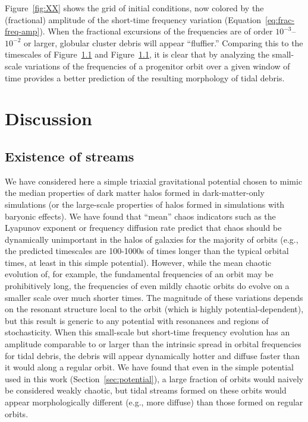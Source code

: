 \documentclass[letterpaper,12pt,preprint]{aastex}
\begin{document}
Figure~\ref{fig:XX} shows the grid of initial conditions, now colored by the (fractional) amplitude of the short-time frequency variation (Equation~\ref{eq:frac-freq-amp}). When the fractional excursions of the frequencies are of order $10^{-3}$--$10^{-2}$ or larger, globular cluster debris will appear ``fluffier.'' Comparing this to the timescales of Figure~\ref{} and Figure~\ref{}, it is clear that by analyzing the small-scale variations of the frequencies of a progenitor orbit over a given window of time provides a better prediction of the resulting morphology of tidal debris. 

\section{Discussion}\label{sec:discussion}

\subsection{Existence of streams}

We have considered here a simple triaxial gravitational potential chosen to mimic the median properties of dark matter halos formed in dark-matter-only simulations (or the large-scale properties of halos formed in simulations with baryonic effects). We have found that ``mean'' chaos indicators such as the Lyapunov exponent or frequency diffusion rate predict that chaos should be dynamically unimportant in the halos of galaxies for the majority of orbits (e.g., the predicted timescales are 100-1000s of times longer than the typical orbital times, at least in this simple potential). However, while the mean chaotic evolution of, for example, the fundamental frequencies of an orbit may be prohibitively long, the frequencies of even mildly chaotic orbits do evolve on a smaller scale over much shorter times. The magnitude of these variations depends on the resonant structure local to the orbit (which is highly potential-dependent), but this result is generic to any potential with resonances and regions of stochasticity. When this small-scale but short-time frequency evolution has an amplitude comparable to or larger than the intrinsic spread in orbital frequencies for tidal debris, the debris will appear dynamically hotter and diffuse faster than it would along a regular orbit. We have found that even in the simple potential used in this work (Section~\ref{sec:potential}), a large fraction of orbits would naively be considered weakly chaotic, but tidal streams formed on these orbits would appear morphologically different (e.g., more diffuse) than those formed on regular orbits. 
\end{document}
